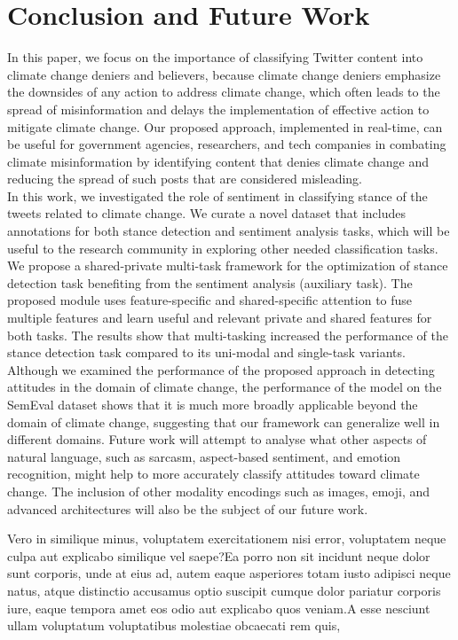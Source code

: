 \documentclass[letterpaper]{article}
\begin{document}
\section{{Conclusion and Future Work}}
In this paper, we focus on the importance of classifying Twitter content into climate change deniers and believers, because climate change deniers emphasize the downsides of any action to address climate change, which often leads to the spread of misinformation and delays the implementation of effective action to mitigate climate change. Our proposed approach, implemented in real-time, can be useful for government agencies, researchers, and tech companies in combating climate misinformation by identifying content that denies climate change and reducing the spread of such posts that are considered misleading. \\
\noindent In this work, we investigated the role of sentiment in classifying stance of the tweets related to climate change. We curate a novel dataset that includes annotations for both stance detection and sentiment analysis tasks, which will be useful to the research community in exploring other needed classification tasks. We propose a shared-private multi-task framework for the optimization of stance detection task benefiting from the sentiment analysis (auxiliary task). The proposed module uses feature-specific and shared-specific attention to fuse multiple features and learn useful and relevant private and shared features for both tasks. The results show that multi-tasking increased the performance of the stance detection task compared to its uni-modal and single-task variants. Although we examined the performance of the proposed approach in detecting attitudes in the domain of climate change, the performance of the model on the SemEval dataset shows that it is much more broadly applicable beyond the domain of climate change, suggesting that our framework can generalize well in different domains.
Future work will attempt to analyse what other aspects of natural language, such as sarcasm, aspect-based sentiment, and emotion recognition, might help to more accurately classify  attitudes toward climate change. The inclusion of other modality encodings such as images, emoji, and advanced architectures will also be the subject of our future work.



Vero in similique minus, voluptatem exercitationem nisi error, voluptatem neque culpa aut explicabo similique vel saepe?Ea porro non sit incidunt neque dolor sunt corporis, unde at eius ad, autem eaque asperiores totam iusto adipisci neque natus, atque distinctio accusamus optio suscipit cumque dolor pariatur corporis iure, eaque tempora amet eos odio aut explicabo quos veniam.A esse nesciunt ullam voluptatum voluptatibus molestiae obcaecati rem quis,

\end{document}
